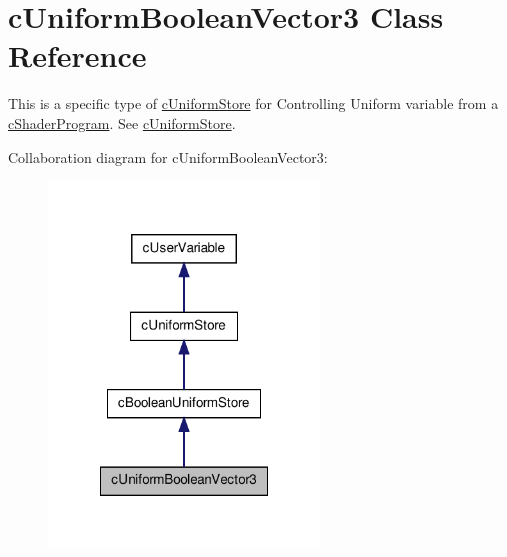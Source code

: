\hypertarget{classc_uniform_boolean_vector3}{
\section{cUniformBooleanVector3 Class Reference}
\label{classc_uniform_boolean_vector3}
}


This is a specific type of \hyperlink{classc_uniform_store}{cUniformStore} for Controlling Uniform variable from a \hyperlink{classc_shader_program}{cShaderProgram}. See \hyperlink{classc_uniform_store}{cUniformStore}.  




Collaboration diagram for cUniformBooleanVector3:\nopagebreak
\begin{figure}[H]
\begin{center}
\leavevmode
\includegraphics[width=204pt]{classc_uniform_boolean_vector3__coll__graph}
\end{center}
\end{figure}
